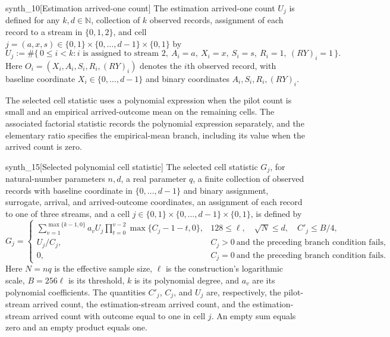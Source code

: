 \begin{definitionv}{synth_10}[Estimation arrived-one count]
The estimation arrived-one count \(U_j\) is defined for any \(k,d\in\mathbb N\), collection of \(k\) observed records, assignment of each record to a stream in \(\{0,1,2\}\), and cell \(j=(a,x,s)\in\{0,1\}\times\{0,\ldots,d-1\}\times\{0,1\}\) by
\[
U_j
:=
\#\bigl\{\,0\le i<k:
i\text{ is assigned to stream }2,\ 
A_i=a,\ X_i=x,\ S_i=s,\ R_i=1,\ (RY)_i=1
\,\bigr\}.
\]
Here \(O_i=(X_i,A_i,S_i,R_i,(RY)_i)\) denotes the \(i\)th observed record, with baseline coordinate \(X_i\in\{0,\ldots,d-1\}\) and binary coordinates \(A_i,S_i,R_i,(RY)_i\).
\end{definitionv}

The selected cell statistic  uses a polynomial expression when the pilot count is small and an empirical arrived-outcome mean on the remaining cells. The associated factorial statistic  records the polynomial expression separately, and the elementary ratio  specifies the empirical-mean branch, including its value when the arrived count is zero.

\begin{definitionv}{synth_15}[Selected polynomial cell statistic]
The selected cell statistic \(G_j\), for natural-number parameters \(n,d\), a real parameter \(q\), a finite collection of observed records with baseline coordinate in \(\{0,\ldots,d-1\}\) and binary assignment, surrogate, arrival, and arrived-outcome coordinates, an assignment of each record to one of three streams, and a cell \(j\in\{0,1\}\times\{0,\ldots,d-1\}\times\{0,1\}\), is defined by
\[
G_j=
\begin{cases}
\displaystyle
\sum_{v=1}^{\max\{k-1,0\}}
a_v U_j
\prod_{t=0}^{v-2}\max\{C_j-1-t,0\},
&
128\le \ell,\quad \sqrt{N}\le d,\quad C'_j\le B/4,
\\[6pt]
\displaystyle U_j/C_j,
&
C_j>0
\ \text{and the preceding branch condition fails},
\\[4pt]
0,
&
C_j=0
\ \text{and the preceding branch condition fails}.
\end{cases}
\]
Here \(N=nq\) is the effective sample size, \(\ell\) is the construction's logarithmic scale, \(B=256\ell\) is its threshold, \(k\) is its polynomial degree, and \(a_v\) are its polynomial coefficients. The quantities \(C'_j\), \(C_j\), and \(U_j\) are, respectively, the pilot-stream arrived count, the estimation-stream arrived count, and the estimation-stream arrived count with outcome equal to one in cell \(j\). An empty sum equals zero and an empty product equals one.
\end{definitionv}

